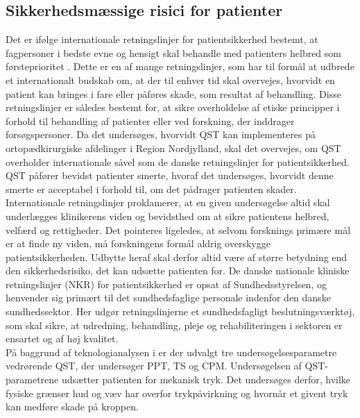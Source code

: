 \subsection{Sikkerhedsmæssige risici for patienter}
Det er ifølge internationale retningslinjer for patientsikkerhed bestemt, at fagpersoner i bedste evne og hensigt skal behandle med patienters helbred som førsteprioritet \citep{helsinki2013}. Dette er en af mange retningslinjer, som har til formål at udbrede et internationalt budskab om, at der til enhver tid skal overvejes, hvorvidt en patient kan bringes i fare eller påføres skade, som resultat af behandling. Disse retningslinjer er således bestemt for, at sikre overholdelse af etiske principper i forhold til behandling af patienter eller ved forskning, der inddrager forsøgspersoner. Da det undersøges, hvorvidt QST kan implementeres på ortopædkirurgiske afdelinger i Region Nordjylland, skal det overvejes, om QST overholder internationale såvel som de danske retningslinjer for patientsikkerhed. \citep{helsinki2013} \\
QST påfører bevidst patienter smerte, hvoraf det undersøges, hvorvidt denne smerte er acceptabel i forhold til, om det pådrager patienten skader. Internationale retningslinjer proklamerer, at en given undersøgelse altid skal underlægges klinikerens viden og bevidsthed om at sikre patientens helbred, velfærd og rettigheder. Det pointeres ligeledes, at selvom forsknings primære mål er at finde ny viden, må forskningens formål aldrig overskygge patientsikkerheden. Udbytte heraf skal derfor altid være af større betydning end den sikkerhedsrisiko, det kan udsætte patienten for. \citep{helsinki2013} De danske nationale kliniske retningslinjer (NKR) for patientsikkerhed er opsat af Sundhedsstyrelsen, og henvender sig primært til det sundhedsfaglige personale indenfor den danske sundhedssektor. Her udgør retningslinjerne et sundhedsfagligt beslutningsværktøj, som skal sikre, at udredning, behandling, pleje og rehabiliteringen i sektoren er ensartet og af høj kvalitet. \citep{nkr2016} \citep{kommissorium2012} \\
På baggrund af teknologianalysen i  er der udvalgt tre undersøgelsesparametre vedrørende QST, der undersøger PPT, TS og CPM. Undersøgelsen af QST-parametrene udsætter patienten for mekanisk tryk. Det undersøges derfor, hvilke fysiske grænser hud og væv har overfor trykpåvirkning og hvornår et givent tryk kan medføre skade på kroppen.


